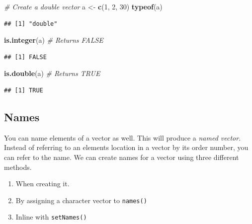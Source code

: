 \documentclass[
]{book}
\newenvironment{Shaded}{\begin{snugshade}}{\end{snugshade}}
\newcommand{\CommentTok}[1]{\textcolor[rgb]{0.56,0.35,0.01}{\textit{#1}}}
\newcommand{\DecValTok}[1]{\textcolor[rgb]{0.00,0.00,0.81}{#1}}
\newcommand{\KeywordTok}[1]{\textcolor[rgb]{0.13,0.29,0.53}{\textbf{#1}}}
\newcommand{\NormalTok}[1]{#1}
\newcommand{\StringTok}[1]{\textcolor[rgb]{0.31,0.60,0.02}{#1}}
\begin{document}
\begin{Shaded}
\begin{Highlighting}[]
\CommentTok{# Create a double vector}
\NormalTok{a <-}\StringTok{ }\KeywordTok{c}\NormalTok{(}\DecValTok{1}\NormalTok{, }\DecValTok{2}\NormalTok{, }\DecValTok{30}\NormalTok{)}
\KeywordTok{typeof}\NormalTok{(a)}
\end{Highlighting}
\end{Shaded}

\begin{verbatim}
## [1] "double"
\end{verbatim}

\begin{Shaded}
\begin{Highlighting}[]
\KeywordTok{is.integer}\NormalTok{(a)  }\CommentTok{# Returns FALSE}
\end{Highlighting}
\end{Shaded}

\begin{verbatim}
## [1] FALSE
\end{verbatim}

\begin{Shaded}
\begin{Highlighting}[]
\KeywordTok{is.double}\NormalTok{(a)  }\CommentTok{# Returns TRUE}
\end{Highlighting}
\end{Shaded}

\begin{verbatim}
## [1] TRUE
\end{verbatim}

\hypertarget{names}{%
\subsection{Names}\label{names}}

You can name elements of a vector as well. This will produce a \emph{named vector}. Instead of referring to an elements location in a vector by its order number, you can refer to the name. We can create names for a vector using three different methods.

\begin{enumerate}
\def\labelenumi{\arabic{enumi})}
\item
  When creating it.
\item
  By assigning a character vector to \texttt{names()}
\item
  Inline with \texttt{setNames()}
\end{enumerate}
\end{document}
